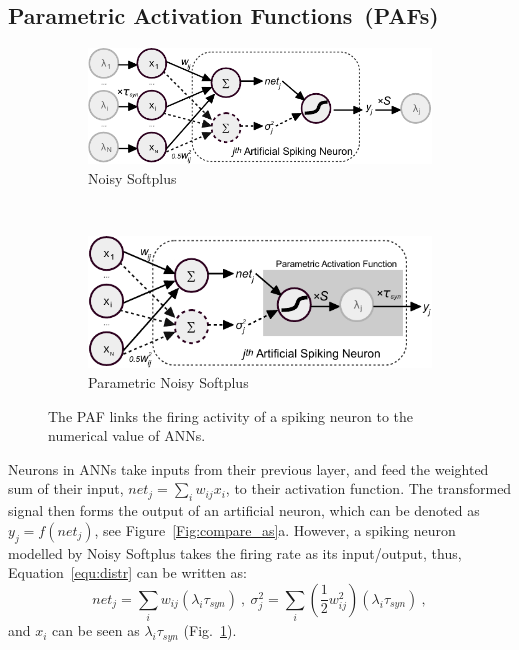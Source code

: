 \documentclass{article}
\begin{document}
\subsection{Parametric Activation Functions~(PAFs)}
\begin{figure}[tbh!]
	\centering
	\begin{subfigure}[t]{0.49\textwidth}
		\includegraphics[width=\textwidth]{pics_iconip/neuron_o.pdf}
		\caption{Noisy Softplus}
    \label{fig:noisy-softplus-neuron}
	\end{subfigure}~~~
	\begin{subfigure}[t]{0.42\textwidth}
		\includegraphics[width=\textwidth]{pics_iconip/neuron_PAF.pdf}
		\caption{Parametric Noisy Softplus}
    \label{fig:parametric-noisy-softplus-neuron}
	\end{subfigure}
	\caption{The PAF links the firing activity of a spiking neuron to the numerical value of ANNs.}
	\label{Fig:tneuron}
\end{figure}


Neurons in ANNs take inputs from their previous layer, and feed the weighted sum of their input, $net_j = \sum_i w_{ij}x_i$, to their activation function.
The transformed signal then forms the output of an artificial neuron, which can be denoted as $y_j=f(net_j)$, see Figure~\ref{Fig:compare_as}a.
However, a spiking neuron modelled by Noisy Softplus takes the firing rate as its input/output, thus, Equation~\ref{equ:distr} can be written as:
\begin{equation}
net_j = \sum_i w_{ij}(\lambda_{i}\tau_{syn})~,
~\sigma^2_j= \sum_i (\frac{1}{2} w_{ij}^2)(\lambda_{i}\tau_{syn})~, 
\label{equ:mi_input}
\end{equation}
and $x_{i}$ can be seen as $\lambda_{i}\tau_{syn}$ (Fig.~\ref{fig:noisy-softplus-neuron}).
\end{document}
